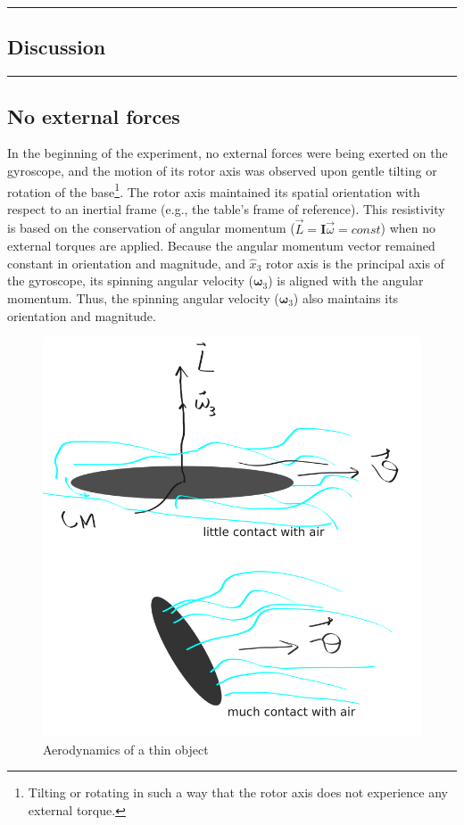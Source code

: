 {\color{gray}\hrule}
\begin{center}
\section{Discussion} \label{sec:discussion}
\bigskip
\end{center}
{\color{gray}\hrule}

\begin{multicols}{2}
\subsection{No external forces}
\label{sec:discussion:no}

In the beginning of the experiment, no external forces were being exerted on the gyroscope, and the motion of its rotor axis was observed upon gentle tilting or rotation of the base\footnote{Tilting or rotating in such a way that the rotor axis does not experience any external torque.}. The rotor axis maintained its spatial orientation with respect to an inertial frame (e.g., the table's frame of reference). This resistivity is based on the conservation of angular momentum ($\vec{L} = \mathbf{I}\vec{\omega} = const$) when no external torques are applied. Because the angular momentum vector remained constant in orientation and magnitude, and $\hat{x}_{3}$ rotor axis is the principal axis of the gyroscope, its spinning angular velocity ($\boldsymbol\omega_{3}$) is aligned with the angular momentum. Thus, the spinning angular velocity ($\boldsymbol\omega_{3}$) also maintains its orientation and magnitude.

\begin{figure}[H]
  \centering
  \includegraphics[width=\columnwidth]{gyroscope/images/thin}
  \caption{Aerodynamics of a thin object }
  \label{fig:discussion:thin}
\end{figure}


\end{multicols}
